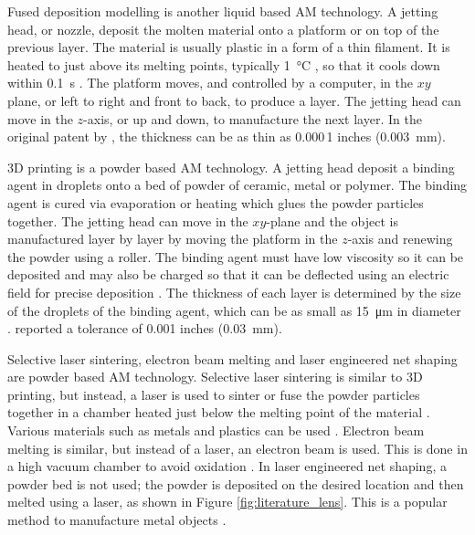 Fused deposition modelling is another liquid based AM technology. A jetting head, or nozzle, deposit the molten material onto a platform or on top of the previous layer. The material is usually plastic in a form of a thin filament. It is heated to just above its melting points, typically \SI{1}{\degreeCelsius} \citep{crump1992apparatus}, so that it cools down within \SI{0.1}{\second} \citep{kruth1991material}. The platform moves, and controlled by a computer, in the $xy$ plane, or left to right and front to back, to produce a layer. The jetting head can move in the $z$-axis, or up and down, to manufacture the next layer. In the original patent by \cite{crump1992apparatus}, the thickness can be as thin as 0.000\,1 inches (\SI{0.003}{\milli\metre}).

3D printing is a powder based AM technology. A jetting head deposit a binding agent in droplets onto a bed of powder of ceramic, metal or polymer. The binding agent is cured via evaporation or heating which glues the powder particles together. The jetting head can move in the $xy$-plane and the object is manufactured layer by layer by moving the platform in the $z$-axis and renewing the powder using a roller. The binding agent must have low viscosity so it can be deposited and may also be charged so that it can be deflected using an electric field for precise deposition \citep{sachs1990three}. The thickness of each layer is determined by the size of the droplets of the binding agent, which can be as small as \SI{15}{\micro\metre} in diameter \citep{sachs1990three}. \cite{sachs1990three} reported a tolerance of 0.001 inches (\SI{0.03}{\milli\metre}).

Selective laser sintering, electron beam melting and laser engineered net shaping are powder based AM technology. Selective laser sintering is similar to 3D printing, but instead, a laser is used to sinter or fuse the powder particles together in a chamber heated just below the melting point of the material \citep{wong2012review}. Various materials such as metals and plastics can be used \citep{wong2012review}. Electron beam melting is similar, but instead of a laser, an electron beam is used. This is done in a high vacuum chamber to avoid oxidation \citep{wong2012review}. In laser engineered net shaping, a powder bed is not used; the powder is deposited on the desired location and then melted using a laser, as shown in Figure \ref{fig:literature_lens}. This is a popular method to manufacture metal objects \citep{gibson2010additive}.

